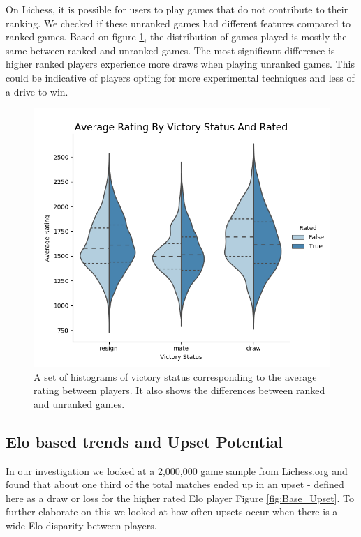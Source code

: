\documentclass[reprint,
 amsmath,amssymb,nobibnotes,
 aps, floatfix]{revtex4-1}
\begin{document}
On Lichess, it is possible for users to play games that do not contribute to their ranking. We checked if these unranked games had different features compared to ranked games. Based on figure \ref{fig:rated}, the distribution of games played is mostly the same between ranked and unranked games. The most significant difference is higher ranked players experience more draws when playing unranked games. This could be indicative of players opting for more experimental techniques and less of a drive to win. 

\begin{figure}
    \centering
    \includegraphics[scale=.5]{image8.png}
    \caption{A set of histograms of victory status corresponding to the average rating between players. It also shows the differences between ranked and unranked games.}
    \label{fig:rated}
\end{figure}
\subsection{Elo based trends and Upset Potential}

In our investigation we looked at a 2,000,000 game sample from Lichess.org and found that about one third of the total matches ended up in an upset - defined here as a draw or loss for the higher rated Elo player Figure \ref{fig:Base_Upset}. To further elaborate on this we looked at how often upsets occur when there is a wide Elo disparity between players.
\end{document}
